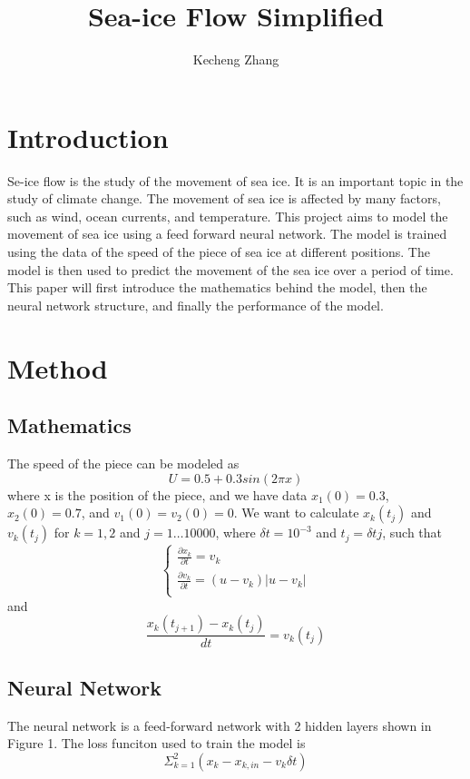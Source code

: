\documentclass[12pt, a4paper]{article}
\begin{document}
\title{Sea-ice Flow Simplified}
\author{Kecheng Zhang}
\maketitle


\section{Introduction}
Se-ice flow is the study of the movement of sea ice. It is an important topic in the study of climate change. The movement of sea ice is affected by many factors, such as wind, ocean currents, and temperature.
This project aims to model the movement of sea ice using a feed forward neural network. The model is trained using the data of the speed of the piece of sea ice at different positions. The model is then used to predict the movement of the sea ice over a period of time.
This paper will first introduce the mathematics behind the model, then the neural network structure, and finally the performance of the model.
\section{Method}

\subsection{Mathematics}
The speed of the piece can be modeled as
$$ U = 0.5 + 0.3sin(2 \pi x) $$
where x is the position of the piece, and we have data
$x_1(0) = 0.3$, $x_2(0) = 0.7$, and $v_1(0) = v_2(0) = 0$.
We want to calculate
$x_k(t_j)$ and $v_k(t_j)$ for $k = 1, 2$ and $j = 1\dots10000$, where
$\delta t = 10^{-3}$ and $t_j = \delta t j$, such that
$$\begin{cases}
    \frac{\partial x_k}{\partial t} = v_k\\
    \frac{\partial v_k}{\partial t} = (u - v_k) |u - v_k|\\
    \end{cases}$$
and $$ \frac{x_k(t_{j+1}) - x_k(t_j)}{dt} = v_k(t_j)$$

\subsection{Neural Network}
The neural network is a feed-forward network with 2 hidden layers shown in Figure 1. The loss funciton used to train the model is $$\Sigma^2_{k=1}(x_k - x_{k,in} - v_k\delta t)$$
\end{document}

